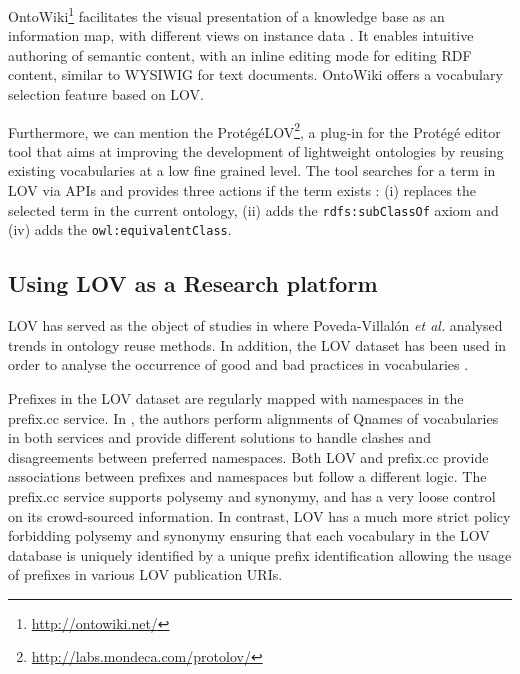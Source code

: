 \documentclass{iosart2c}
\begin{document}
OntoWiki\footnote{\url{http://ontowiki.net/}} facilitates the visual presentation of a knowledge base as an information map, with different views on instance data \cite{auer2006ontowiki}. It enables intuitive authoring of semantic content, with an inline editing mode for editing RDF content, similar to WYSIWIG for text documents. OntoWiki offers a vocabulary selection feature based on LOV.

Furthermore, we can mention the Prot{\'e}g{\'e}LOV\footnote{\url{http://labs.mondeca.com/protolov/}}, a plug-in for the Prot{\'e}g{\'e} editor tool \cite{prolov2015} that aims at improving the development of lightweight ontologies by reusing existing vocabularies at a low fine grained level. The tool searches for a term in LOV via APIs and provides three actions if the term exists : (i) replaces the selected term in the current ontology, (ii) adds the \texttt{rdfs:subClassOf} axiom and (iv) adds the \texttt{owl:equivalentClass}.

\subsection{Using LOV as a Research platform}

LOV has served as the object of studies in \cite{poveda2012landscape} where Poveda-Villal\'on \emph{et al.} analysed trends in ontology reuse methods. In addition, the LOV dataset has been used in order to analyse the occurrence of good and bad practices in vocabularies \cite{poveda2013detecting}.

Prefixes in the LOV dataset are regularly mapped with namespaces in the prefix.cc service. In \cite{wasabi13}, the authors perform alignments of Qnames of vocabularies in both services and provide different solutions to handle clashes and disagreements between preferred namespaces. Both  LOV and prefix.cc provide associations between prefixes and namespaces but follow a different logic. The prefix.cc service supports polysemy and synonymy, and has a very loose control on its crowd-sourced information. In contrast, LOV has a much more strict policy forbidding polysemy and synonymy ensuring that each vocabulary in the LOV database is uniquely identified by a unique prefix identification allowing the usage of prefixes in various LOV publication URIs. 
\end{document}
